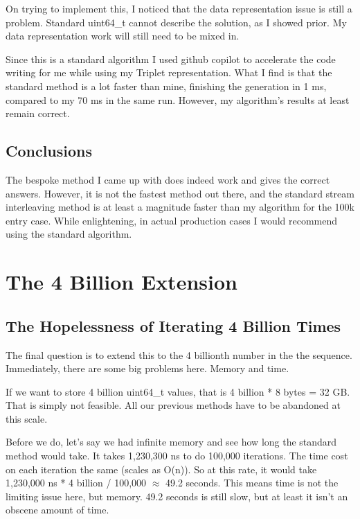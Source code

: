 \documentclass{article}
\begin{document}
On trying to implement this, I noticed that the data representation issue is still a problem. Standard uint64\_t cannot describe the solution, as I showed prior. My data representation work will still need to be mixed in. \newline

Since this is a standard algorithm I used github copilot to accelerate the code writing for me while using my Triplet representation. What I find is that the standard method is a lot faster than mine, finishing the generation in 1 ms, compared to my 70 ms in the same run. However, my algorithm's results at least remain correct.

\subsection{Conclusions}

The bespoke method I came up with does indeed work and gives the correct answers. However, it is not the fastest method out there, and the standard stream interleaving method is at least a magnitude faster than my algorithm for the 100k entry case. While enlightening, in actual production cases I would recommend using the standard algorithm.

\newpage

\section{The 4 Billion Extension}

\subsection{The Hopelessness of Iterating 4 Billion Times}

The final question is to extend this to the 4 billionth number in the the sequence. Immediately, there are some big problems here. Memory and time. \newline

If we want to store 4 billion uint64\_t values, that is 4 billion * 8 bytes = 32 GB. That is simply not feasible. All our previous methods have to be abandoned at this scale. \newline

Before we do, let's say we had infinite memory and see how long the standard method would take. It takes 1,230,300 ns to do 100,000 iterations. The time cost on each iteration the same (scales as O(n)). So at this rate, it would take 1,230,000 ns * 4 billion / 100,000 $\approx$ 49.2 seconds. This means time is not the limiting issue here, but memory. 49.2 seconds is still slow, but at least it isn't an obscene amount of time.\newline
\end{document}
